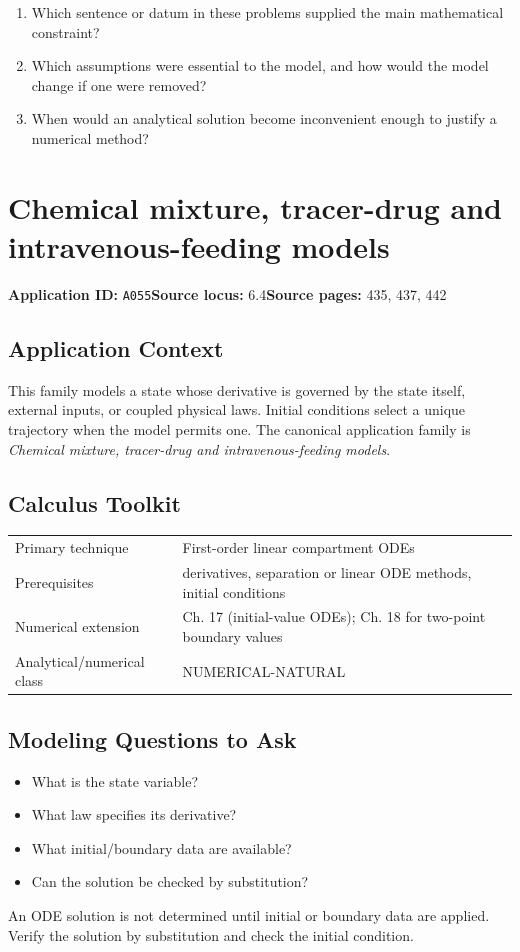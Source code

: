 \documentclass[11pt]{book}
\newcommand{\pid}[1]{\texttt{#1}}
\begin{document}
\begin{reflectionbox}\begin{enumerate}
\item Which sentence or datum in these problems supplied the main mathematical constraint?
\item Which assumptions were essential to the model, and how would the model change if one were removed?
\item When would an analytical solution become inconvenient enough to justify a numerical method?
\end{enumerate}\end{reflectionbox}
\chapter{Chemical mixture, tracer-drug and intravenous-feeding models}\label{app:A055}
\textbf{Application ID:} \pid{A055}\quad \textbf{Source locus:} 6.4\quad \textbf{Source pages:} 435, 437, 442
\section*{Application Context}
This family models a state whose derivative is governed by the state itself, external inputs, or coupled physical laws. Initial conditions select a unique trajectory when the model permits one. The canonical application family is \emph{Chemical mixture, tracer-drug and intravenous-feeding models}.
\section*{Calculus Toolkit}
\begin{tabularx}{\textwidth}{@{}lX@{}}\toprule
Primary technique & First-order linear compartment ODEs \\
Prerequisites & derivatives, separation or linear ODE methods, initial conditions \\
Numerical extension & Ch. 17 (initial-value ODEs); Ch. 18 for two-point boundary values \\
Analytical/numerical class & NUMERICAL-NATURAL \\
\bottomrule\end{tabularx}
\section*{Modeling Questions to Ask}\begin{itemize}
\item What is the state variable?
\item What law specifies its derivative?
\item What initial/boundary data are available?
\item Can the solution be checked by substitution?
\end{itemize}
\begin{errorbox}An ODE solution is not determined until initial or boundary data are applied. Verify the solution by substitution and check the initial condition.\end{errorbox}
\end{document}
